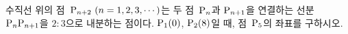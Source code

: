 \hspace*{2mm}\begin{minipage}[t]{\dimexpr\linewidth-2mm\relax}\vspace{0pt}
수직선 위의 점~$\pt{P}_{n+2}\ (n=1{,}\mkern3mu\mathopen{}2{,}\mkern3mu\mathopen{}3{,}\mkern3mu\mathopen{}\cdots)$는 두 점~$\mathrm{P}_n$과 $\mathrm{P}_{n+1}$을 연결하는 선분~$\mathrm{P}_n\mathrm{P}_{n+1}$을 $2:3$으로 내분하는 점이다. $\mathrm{P}_1(0)$, $\mathrm{P}_2(8)$일 때, 점~$\mathrm{P}_5$의 좌표를 구하시오.\end{minipage}

